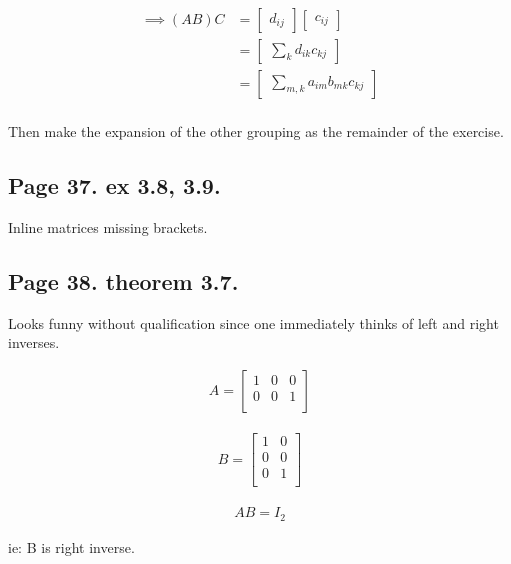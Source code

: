 \documentclass{article}
\begin{document}
\begin{align*}
\implies
(AB) C
&= 
\begin{bmatrix}
d_{ij} 
\end{bmatrix} 
\begin{bmatrix}
c_{ij} 
\end{bmatrix} \\
&= 
\begin{bmatrix}
\sum_k d_{ik} c_{kj} 
\end{bmatrix} \\
&= 
\begin{bmatrix}
\sum_{m,k} a_{im} b_{mk} c_{kj} 
\end{bmatrix} \\
\end{align*}

Then make the expansion of the other grouping as the remainder of the exercise.

\subsection{Page 37.  ex 3.8, 3.9. }

Inline matrices missing brackets.

\subsection{Page 38.  theorem 3.7. }

Looks funny without qualification since one immediately thinks of left and
right inverses.

\begin{align*}
A = 
\begin{bmatrix}
1 & 0 & 0 \\
0 & 0 & 1 \\
\end{bmatrix}
\end{align*}

\begin{align*}
B = 
\begin{bmatrix}
1 & 0 \\
0 & 0 \\
0 & 1 \\
\end{bmatrix}
\end{align*}

\begin{align*}
A B = I_2
\end{align*}

ie: B is right inverse.
\end{document}
